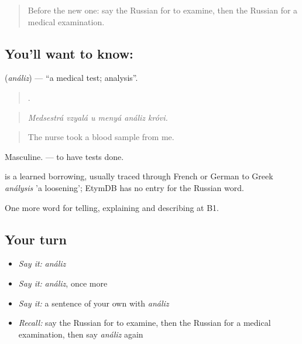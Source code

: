 \label{lesson:RU-C489-analiz}



\begin{quote}
Before the new one: say the Russian for to examine, then the Russian for a medical examination.
\end{quote}

\subsection*{You'll want to know: }
\textbf{} (\emph{análiz}) — \textquotedblleft{}a medical test; analysis\textquotedblright{}.

\begin{quote}
     .
\end{quote}

\begin{quote}
\emph{Medsestrá vzyalá u menyá análiz króvi.}
\end{quote}

\begin{quote}
The nurse took a blood sample from me.
\end{quote}

Masculine. \emph{ } — to have tests done.

\begin{cousinweb}
\emph{} is a learned borrowing, usually traced through French or German to Greek \emph{análysis} 'a loosening'; EtymDB has no entry for the Russian word.
\end{cousinweb}

\begin{grammarlens}[title={What you've built}]
One more word for telling, explaining and describing at B1.
\end{grammarlens}

\subsection*{Your turn}
\begin{itemize}
\raggedright
  \item \emph{Say it:} \emph{análiz}
  \item \emph{Say it:} \emph{análiz}, once more
  \item \emph{Say it:} a sentence of your own with \emph{análiz}
  \item \emph{Recall:} say the Russian for to examine, then the Russian for a medical examination, then say \emph{análiz} again
\end{itemize}


